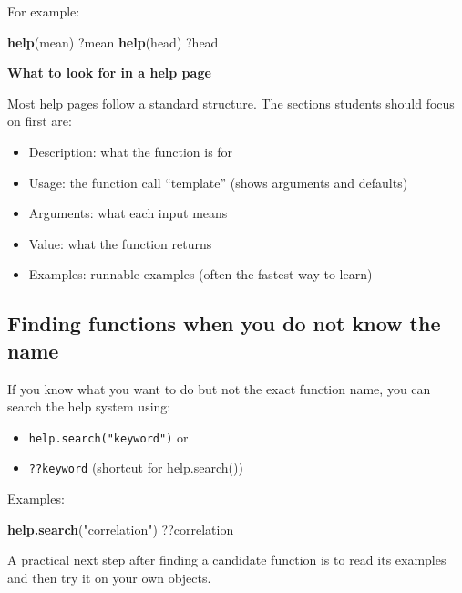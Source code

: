 \documentclass[
  11pt,
]{article}
\newenvironment{Shaded}{\begin{snugshade}}{\end{snugshade}}
\newcommand{\FunctionTok}[1]{\textcolor[rgb]{0.13,0.29,0.53}{\textbf{#1}}}
\newcommand{\NormalTok}[1]{#1}
\newcommand{\StringTok}[1]{\textcolor[rgb]{0.31,0.60,0.02}{#1}}
\providecommand{\tightlist}{%
  \setlength{\itemsep}{0pt}\setlength{\parskip}{0pt}}
\begin{document}
For example:

\begin{Shaded}
\begin{Highlighting}[]
\FunctionTok{help}\NormalTok{(mean)}
\NormalTok{?mean}
\FunctionTok{help}\NormalTok{(head)}
\NormalTok{?head}
\end{Highlighting}
\end{Shaded}

\textbf{What to look for in a help page}

Most help pages follow a standard structure. The sections students
should focus on first are:

\begin{itemize}
\tightlist
\item
  Description: what the function is for
\item
  Usage: the function call ``template'' (shows arguments and defaults)
\item
  Arguments: what each input means
\item
  Value: what the function returns
\item
  Examples: runnable examples (often the fastest way to learn)
\end{itemize}

\subsection{Finding functions when you do not know the
name}\label{finding-functions-when-you-do-not-know-the-name}

If you know what you want to do but not the exact function name, you can
search the help system using:

\begin{itemize}
\tightlist
\item
  \texttt{help.search("keyword")} or
\item
  \texttt{??keyword} (shortcut for help.search())
\end{itemize}

Examples:

\begin{Shaded}
\begin{Highlighting}[]
\FunctionTok{help.search}\NormalTok{(}\StringTok{"correlation"}\NormalTok{)}
\NormalTok{??correlation}
\end{Highlighting}
\end{Shaded}

A practical next step after finding a candidate function is to read its
examples and then try it on your own objects.


\end{document}
